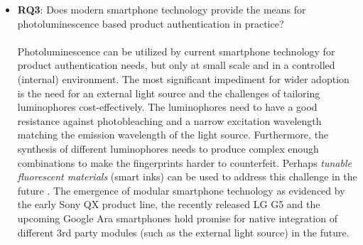 \documentclass[thesis.tex]{subfiles}
\begin{document}
\begin{itemize}[label=, leftmargin=*]
  \item \textbf{RQ3}: Does modern smartphone technology provide the means for photoluminescence based product authentication in practice?\\\\
  Photoluminescence can be utilized by current smartphone technology for product authentication needs, but only at small scale and in a controlled (internal) environment. The most significant impediment for wider adoption is the need for an external light source and the challenges of tailoring luminophores cost-effectively. The luminophores need to have a good resistance against photobleaching and a narrow excitation wavelength matching the emission wavelength of the light source. Furthermore, the synthesis of different luminophores needs to produce complex enough combinations to make the fingerprints harder to counterfeit. Perhaps \emph{tunable fluorescent materials} (smart inks) can be used to address this challenge in the future \cite{smart_ink}. The emergence of modular smartphone technology as evidenced by the early Sony QX product line, the recently released LG G5 and the upcoming Google Ara smartphones hold promise for native integration of different 3rd party modules (such as the external light source) in the future.
\end{itemize}
\end{document}
